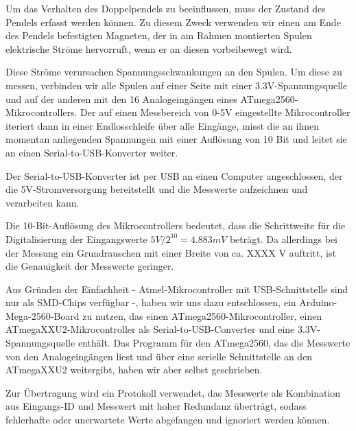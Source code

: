 Um das Verhalten des Doppelpendels zu beeinflussen, muss der Zustand des Pendels
erfasst werden können. Zu diesem Zweck verwenden wir einen am Ende des Pendels
befestigten Magneten, der in am Rahmen montierten Spulen elektrische Ströme
hervorruft, wenn er an diesen vorbeibewegt wird.

Diese Ströme verursachen Spannungsschwankungen an den Spulen. Um diese zu messen,
verbinden wir alle Spulen auf einer Seite mit einer 3.3V-Spannungsquelle und auf der
anderen mit den 16 Analogeingängen eines ATmega2560-Mikrocontrollers. Der auf einen
Messbereich von 0-5V eingestellte Mikrocontroller iteriert dann in einer Endlosschleife
über alle Eingänge, misst die an ihnen momentan anliegenden Spannungen mit einer
Auflösung von 10 Bit und leitet sie an einen Serial-to-USB-Konverter weiter.

Der Serial-to-USB-Konverter ist per USB an einen Computer angeschlossen, der die 5V-Stromversorgung
bereitstellt und die Messwerte aufzeichnen und verarbeiten kann.

Die 10-Bit-Auflösung des Mikrocontrollers bedeutet, dass die Schrittweite für die Digitalisierung
der Eingangswerte $ 5V / 2^{10} = 4.883mV $ beträgt. Da allerdings bei der Messung ein
Grundrauschen mit einer Breite von ca. XXXX V auftritt, ist die Genauigkeit der Messwerte geringer.

Aus Gründen der Einfachheit - Atmel-Mikrocontroller mit USB-Schnittstelle sind nur als SMD-Chips
verfügbar -, haben wir uns dazu entschlossen, ein Arduino-Mega-2560-Board zu nutzen, das einen
ATmega2560-Mikrocontroller, einen ATmegaXXU2-Mikrocontroller als Serial-to-USB-Converter und eine
3.3V-Spannungsquelle enthält. Das Programm für den ATmega2560, das die Messwerte von den
Analogeingängen liest und über eine serielle Schnittstelle an den ATmegaXXU2 weitergibt, haben
wir aber selbst geschrieben.

Zur Übertragung wird ein Protokoll verwendet, das Messwerte als Kombination aus Eingangs-ID und
Messwert mit hoher Redundanz überträgt, sodass fehlerhafte oder unerwartete Werte abgefangen und
ignoriert werden können.